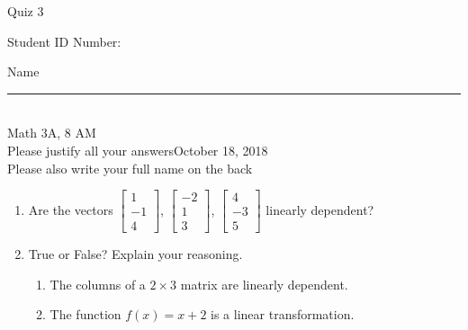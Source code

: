 \documentclass[12pt]{article}
\begin{document}
\begin{flushleft} 
\centerline{\LARGE{Quiz 3}} 
\vspace{5 mm}
{Student ID Number:}\hfill  
{Name \rule {2 in}{0.01in}}\\
Math 3A, 8 AM
\\
{Please justify all your answers}\hfill {October 18, 2018}
\\
{Please also write your full name on the back} 

\medskip
\end{flushleft}

\begin{enumerate}
	\item Are the vectors $\begin{bmatrix}
		1\\-1\\4
	\end{bmatrix}$, $\begin{bmatrix}
		-2\\1\\3
	\end{bmatrix}$, $\begin{bmatrix}
		4\\-3\\5
	\end{bmatrix}$ linearly dependent?

	\vfill

	\item True or False? Explain your reasoning.
	\begin{enumerate}
		\item The columns of a $2\times 3$ matrix are linearly dependent.
		\vfill
		\item The function $f(x) = x+2$ is a linear transformation.
		\vfill
	\end{enumerate}
\end{enumerate}

\end{document}

